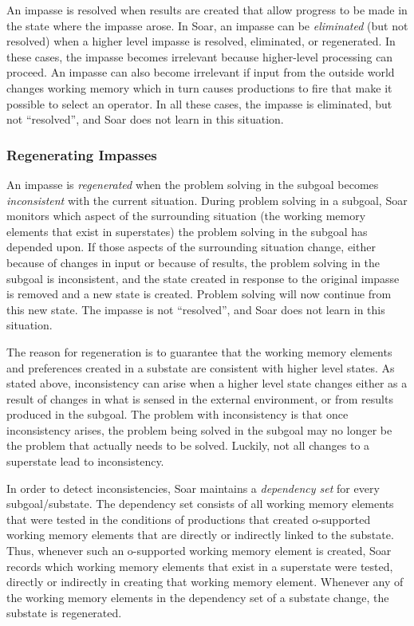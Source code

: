 An impasse is resolved when results are created that allow progress to
be made in the state where the impasse arose.  In Soar, an impasse can be
\textit{eliminated} (but not resolved) when a higher level impasse is
resolved, eliminated, or regenerated.  In these cases, the impasse
becomes irrelevant because higher-level processing can proceed.  An
impasse can also become irrelevant if input from the outside world
changes working memory which in turn causes productions to fire that
make it possible to select an operator.  In all these cases, the impasse
is eliminated, but not ``resolved'', and Soar does not learn in this
situation.

\subsubsection*{Regenerating Impasses}

An impasse is \textit{regenerated} when the problem solving in the
subgoal becomes {\em inconsistent} with the current situation.  During
problem solving in a subgoal, Soar monitors which aspect of the
surrounding situation (the working memory elements that exist in
superstates) the problem solving in the subgoal has depended upon.  If
those aspects of the surrounding situation change, either because of
changes in input or because of results, the problem solving in the
subgoal is inconsistent, and the state created in response to the
original impasse is removed and a new state is created. Problem solving
will now continue from this new state.  The impasse is not ``resolved'',
and Soar does not learn in this situation.

The reason for regeneration is to guarantee that the working memory
elements and preferences created in a substate are consistent with
higher level states.  As stated above, inconsistency can arise when a
higher level state changes either as a result of changes in what is
sensed in the external environment, or from results produced in the
subgoal.  The problem with inconsistency is that once inconsistency
arises, the problem being solved in the subgoal may no longer be the
problem that actually needs to be solved.  Luckily, not all changes to a
superstate lead to inconsistency.

In order to detect inconsistencies, Soar maintains a 
\emph{dependency set} for every \\
subgoal/substate. 
The dependency set consists of all working
memory elements that were tested in the conditions of productions that
created o-supported working memory elements that are directly or
indirectly linked to the substate.  Thus, whenever such an o-supported
working memory element is created, Soar records which working memory
elements that exist in a superstate were tested, directly or indirectly
in creating that working memory element.  Whenever
any of the working memory elements in the dependency set of a substate
change, the substate is regenerated.

